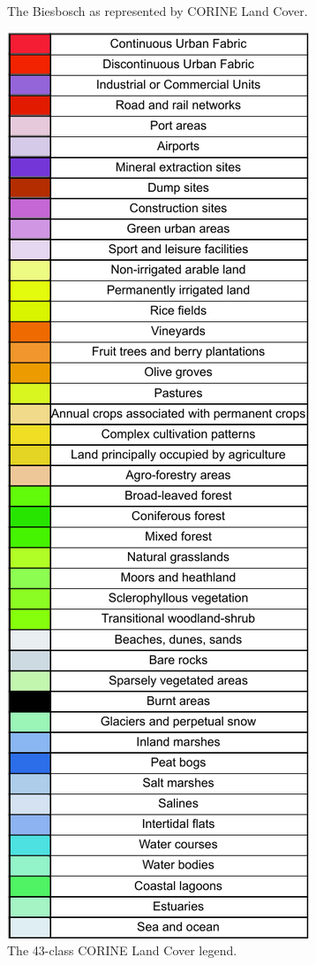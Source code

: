 \begin{figure}[H]
\begin{minipage}{0.5\textwidth}
                \caption{The Biesbosch as represented by CORINE Land Cover.}
            \end{minipage}
            \hfill
            \begin{minipage}{0.49\textwidth}
                \centering
                \includegraphics[width=\linewidth,height=2.15\textwidth,keepaspectratio]{figs_01/corine_legend.pdf}
                \caption{The 43-class CORINE Land Cover legend.}
                \label{fig:second_col_fig}
            \end{minipage}
            \label{fig:two_column_layout}
        \end{figure}

